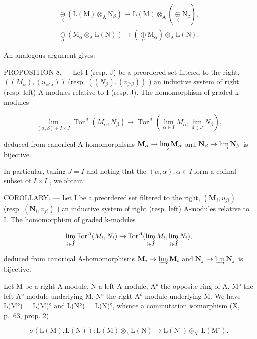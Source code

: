 \[
\begin{array}{l} \underset {\beta} {\oplus} (\mathrm{L(M)} \otimes_ {\mathrm{A}} \mathrm {N}_ {\beta}) \to \mathrm{L(M)} \otimes_ {\mathrm{A}} (\underset {\beta} {\oplus} \mathrm {N}_ {\beta}), \\ \underset {\alpha} {\oplus} (\mathrm {M}_ {\alpha} \otimes_ {\mathrm{A}} \mathrm{L(N)}) \to (\underset {\alpha} {\oplus} \mathrm {M}_ {\alpha}) \otimes_ {\mathrm{A}} \mathrm{L(N)}. \end{array}
\]

An analogous argument gives:

PROPOSITION 8. --- Let I (resp. J) be a preordered set filtered to the right, \(((M_{\alpha}), (u_{\alpha' \alpha}))\) (resp. \(((N_{\beta}), (v_{\beta' \beta}))\) ) an inductive system of right (resp. left) A-modules relative to I (resp. J). The homomorphism of graded k-modules

\[
\lim _ {(\alpha , \beta) \in I \times J} \operatorname{Tor} ^ {A} \left(M _ {\alpha}, N _ {\beta}\right)\rightarrow \operatorname{Tor} ^ {A} \left(\lim _ {\alpha \in I} M _ {\alpha}, \lim _ {\beta \in J} N _ {\beta}\right),
\]

deduced from canonical A-homomorphisms \(\mathbf{M}_{\alpha} \to \varinjlim \mathbf{M}_{\alpha}\) and \(\mathbf{N}_{\beta} \to \varinjlim \mathbf{N}_{\beta}\) is bijective.

In particular, taking \(J = I\) and noting that the \((\alpha, \alpha), \alpha \in I\) form a cofinal subset of \(I \times I\) , we obtain:

COROLLARY. --- Let I be a preordered set filtered to the right, \((\mathbf{M}_{i}, u_{ji})\) (resp. \((\mathbf{N}_{i}, v_{ji})\) ) an inductive system of right (resp. left) A-modules relative to I. The homomorphism of graded k-modules

\[
\varinjlim_ {i \in I} \operatorname{Tor} ^ {A} (M _ {i}, N _ {i}) \rightarrow \operatorname{Tor} ^ {A} (\varinjlim_ {i \in I} M _ {i}, \varinjlim_ {i \in I} N _ {i}),
\]

deduced from canonical A-homomorphisms \(\mathbf{M}_i\to \varinjlim \mathbf{M}_i\) and \(\mathbf{N}_j\to \varinjlim \mathbf{N}_j\) is bijective.

Let M be a right A-module, N a left A-module, A° the opposite ring of A, M° the left A°-module underlying M, N° the right A°-module underlying M. We have L(M°) = L(M)° and L(N°) = L(N)°, whence a commutation isomorphism (X, p.~63, prop. 2)

\[
\sigma (\mathrm{L} (\mathrm{M}), \mathrm{L} (\mathrm{N})): \mathrm{L} (\mathrm{M}) \otimes_ {\mathrm{A}} \mathrm{L} (\mathrm{N}) \rightarrow \mathrm{L} (\mathrm{N} ^ {\circ}) \otimes_ {\mathrm{A} ^ {0}} \mathrm{L} (\mathrm{M} ^ {\circ}).
\]

